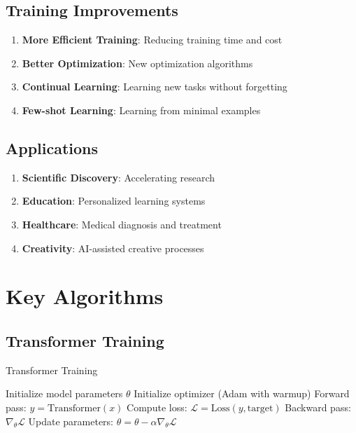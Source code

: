 \documentclass[11pt,a4paper]{article}
\begin{document}
\subsection{Training Improvements}

\begin{enumerate}
\item \textbf{More Efficient Training}: Reducing training time and cost
\item \textbf{Better Optimization}: New optimization algorithms
\item \textbf{Continual Learning}: Learning new tasks without forgetting
\item \textbf{Few-shot Learning}: Learning from minimal examples
\end{enumerate}

\subsection{Applications}

\begin{enumerate}
\item \textbf{Scientific Discovery}: Accelerating research
\item \textbf{Education}: Personalized learning systems
\item \textbf{Healthcare}: Medical diagnosis and treatment
\item \textbf{Creativity}: AI-assisted creative processes
\end{enumerate}

\section{Key Algorithms}

\subsection{Transformer Training}

\begin{algorithm}
\caption{Transformer Training}
\begin{algorithmic}[1]
\STATE Initialize model parameters $\theta$
\STATE Initialize optimizer (Adam with warmup)
        \STATE Forward pass: $y = \text{Transformer}(x)$
        \STATE Compute loss: $\mathcal{L} = \text{Loss}(y, \text{target})$
        \STATE Backward pass: $\nabla_\theta \mathcal{L}$
        \STATE Update parameters: $\theta = \theta - \alpha \nabla_\theta \mathcal{L}$
    \ENDFOR
\ENDFOR
\end{algorithmic}
\end{algorithm}
\end{document}
